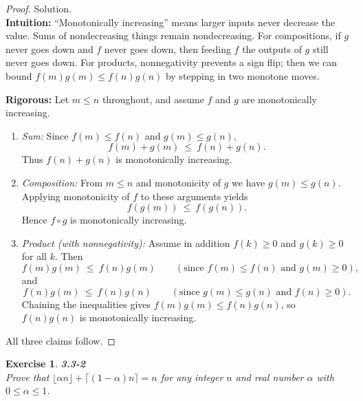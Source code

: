 \documentclass[12pt]{article}
\newtheorem{exercise}[theorem]{Exercise}
\theoremstyle{definition}
\begin{document}
\begin{proof}
Solution. \\

\noindent
\textbf{Intuition:}  
“Monotonically increasing” means larger inputs never decrease the value.
Sums of nondecreasing things remain nondecreasing. For compositions, if $g$ never
goes down and $f$ never goes down, then feeding $f$ the outputs of $g$ still never goes
down. For products, nonnegativity prevents a sign flip; then we can bound
$f(m)g(m)\le f(n)g(n)$ by stepping in two monotone moves.

\noindent
\textbf{Rigorous:}  
Let $m\le n$ throughout, and assume $f$ and $g$ are monotonically increasing.
\begin{enumerate}
\item \emph{Sum:} Since $f(m)\le f(n)$ and $g(m)\le g(n)$,
\[
f(m)+g(m)\ \le\ f(n)+g(n).
\]
Thus $f(n)+g(n)$ is monotonically increasing.

\item \emph{Composition:} From $m\le n$ and monotonicity of $g$ we have $g(m)\le g(n)$.
Applying monotonicity of $f$ to these arguments yields
\[
f(g(m))\ \le\ f(g(n)).
\]
Hence $f\!\circ g$ is monotonically increasing.

\item \emph{Product (with nonnegativity):} Assume in addition $f(k)\ge 0$ and $g(k)\ge 0$
for all $k$. Then
\[
f(m)g(m)\ \le\ f(n)g(m) \qquad (\text{since } f(m)\le f(n) \text{ and } g(m)\ge 0),
\]
and
\[
f(n)g(m)\ \le\ f(n)g(n) \qquad (\text{since } g(m)\le g(n) \text{ and } f(n)\ge 0).
\]
Chaining the inequalities gives $f(m)g(m)\le f(n)g(n)$, so $f(n)g(n)$ is
monotonically increasing.
\end{enumerate}
All three claims follow.
\end{proof}

\newpage

\begin{exercise}
\noindent
\textbf{3.3-2} \\
Prove that $\lfloor \alpha n \rfloor + \lceil (1-\alpha)n \rceil = n$ for any integer $n$ and real number $\alpha$ with $0 \le \alpha \le 1$.
\end{exercise}
\end{document}
